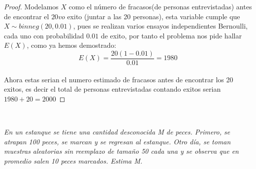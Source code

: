 \documentclass[11pt]{article}
\begin{document}
\begin{proof}
    Modelamos $X$ como el n\'umero de fracasos(de personas entrevistadas) antes de encontrar el $20vo$ exito (juntar a las 20 personas), esta variable cumple que $X\sim bin neg(20,0.01)$, pues se realizan varios ensayos independientes Bernoulli, cada uno con probabilidad $0.01$ de exito, por tanto el problema nos pide 
    hallar $E(X)$, como ya hemos demostrado:\,\\
    \begin{equation*}
        E(X)=\frac{20(1-0.01)}{0.01}=1980
    \end{equation*}\,\\
    Ahora estas serian el numero estimado de fracasos antes de encontrar los 20 exitos, es decir el total de personas entrevistadas contando exitos serian $1980+20=2000$
\end{proof}
\,\\
\begin{tcolorbox}[title = \textcolor{black}{\textcolor{white}{Problema 5}}]
\textit{En un estanque se tiene una cantidad desconocida M de peces. Primero, se atrapan 100 peces, se marcan y se regresan al estanque. Otro d\'ia, se toman muestras aleatorias sin reemplazo de tamaño 50 cada una y se observa que en promedio salen 10 peces marcados. Estima M.
}
\end{tcolorbox}
\end{document}
